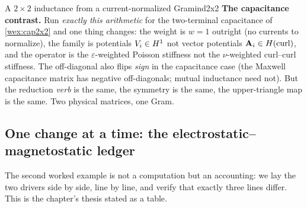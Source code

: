 \begin{workedexample}{A $2\times2$ inductance from a current-normalized Gram}{ind2x2}
\textbf{The capacitance contrast.} Run \emph{exactly this arithmetic} for the
two-terminal capacitance of \cref{wex:cap2x2} and one thing changes: the weight is
$w=1$ outright (no currents to normalize), the family is potentials $V_i\in H^1$
not vector potentials $\mathbf{A}_i\in H(\mathrm{curl})$, and the operator is the
$\varepsilon$-weighted Poisson stiffness not the $\nu$-weighted curl--curl
stiffness. The off-diagonal also flips \emph{sign} in the capacitance case (the
Maxwell capacitance matrix has negative off-diagonals; mutual inductance need not).
But the reduction \emph{verb} is the same, the symmetry is the same, the
upper-triangle map is the same. Two physical matrices, one Gram.
\end{workedexample}

\subsection{One change at a time: the electrostatic--magnetostatic ledger}

The second worked example is not a computation but an accounting: we lay the two
drivers side by side, line by line, and verify that exactly three lines differ. This
is the chapter's thesis stated as a table.

